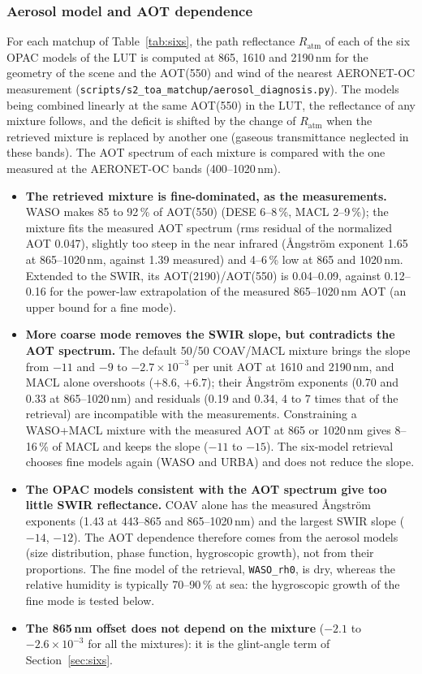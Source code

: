 \documentclass[11pt,a4paper]{article}
\newcommand{\code}[1]{\texttt{#1}}
\begin{document}
\subsubsection{Aerosol model and AOT dependence}
\label{sec:aerosol_diag}
For each matchup of Table~\ref{tab:sixs}, the path reflectance $R_\mathrm{atm}$ of each of the six OPAC models of the
LUT is computed at 865, 1610 and 2190\,nm for the geometry of the scene and the AOT(550) and wind of the nearest
AERONET-OC measurement (\code{scripts/s2\_toa\_matchup/aerosol\_diagnosis.py}). The models being combined linearly
at the same AOT(550) in the LUT, the reflectance of any mixture follows, and the deficit is shifted by the change
of $R_\mathrm{atm}$ when the retrieved mixture is replaced by another one (gaseous transmittance neglected in these
bands). The AOT spectrum of each mixture is compared with the one measured at the AERONET-OC bands (400--1020\,nm).

\begin{itemize}
\item \textbf{The retrieved mixture is fine-dominated, as the measurements.} WASO makes 85 to 92\,\% of AOT(550)
  (DESE 6--8\,\%, MACL 2--9\,\%); the mixture fits the measured AOT spectrum (rms residual of the normalized AOT
  0.047), slightly too steep in the near infrared (Ångström exponent 1.65 at 865--1020\,nm, against 1.39 measured)
  and 4--6\,\% low at 865 and 1020\,nm. Extended to the SWIR, its AOT(2190)/AOT(550) is 0.04--0.09, against 0.12--0.16
  for the power-law extrapolation of the measured 865--1020\,nm AOT (an upper bound for a fine mode).
\item \textbf{More coarse mode removes the SWIR slope, but contradicts the AOT spectrum.} The default 50/50
  COAV/MACL mixture brings the slope from $-11$ and $-9$ to $-2.7\times10^{-3}$ per unit AOT at 1610 and 2190\,nm, and
  MACL alone overshoots ($+8.6$, $+6.7$); their Ångström exponents (0.70 and 0.33 at 865--1020\,nm) and residuals
  (0.19 and 0.34, 4 to 7 times that of the retrieval) are incompatible with the measurements. Constraining a
  WASO+MACL mixture with the measured AOT at 865 or 1020\,nm gives 8--16\,\% of MACL and keeps the slope ($-11$ to
  $-15$). The six-model retrieval chooses fine models again (WASO and URBA) and does not reduce the slope.
\item \textbf{The OPAC models consistent with the AOT spectrum give too little SWIR reflectance.} COAV alone has
  the measured Ångström exponents (1.43 at 443--865 and 865--1020\,nm) and the largest SWIR slope ($-14$, $-12$).
  The AOT dependence therefore comes from the aerosol models (size distribution, phase function, hygroscopic growth),
  not from their proportions. The fine model of the retrieval, \code{WASO\_rh0}, is dry, whereas the relative
  humidity is typically 70--90\,\% at sea: the hygroscopic growth of the fine mode is tested below.
\item \textbf{The 865\,nm offset does not depend on the mixture} ($-2.1$ to $-2.6\times10^{-3}$ for all the
  mixtures): it is the glint-angle term of Section~\ref{sec:sixs}.
\end{itemize}
\end{document}
